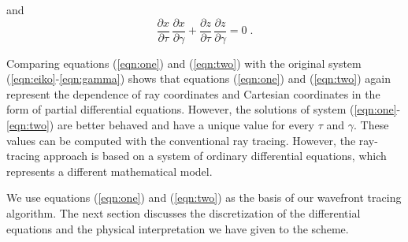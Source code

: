 and
\begin{equation}
  \label{eqn:two}
  \frac{\partial x}{\partial \tau}\,\frac{\partial x}{\partial \gamma}  +
  \frac{\partial z}{\partial \tau}\,\frac{\partial z}{\partial \gamma} = 0\;.
\end{equation}
\par
Comparing equations (\ref{eqn:one}) and (\ref{eqn:two}) with the original
system (\ref{eqn:eiko}-\ref{eqn:gamma}) shows that equations (\ref{eqn:one})
and (\ref{eqn:two}) again represent the dependence of ray coordinates and
Cartesian coordinates in the form of partial differential equations. 
However, the solutions of system (\ref{eqn:one}-\ref{eqn:two}) are better
behaved and have a unique value for every $\tau$ and $\gamma$.  These values
can be computed with the conventional ray tracing. However, the ray-tracing
approach is based on a system of ordinary differential equations, which
represents a different mathematical model.
\par
We use equations (\ref{eqn:one}) and (\ref{eqn:two}) as the basis of our
wavefront tracing algorithm. The next section discusses the discretization of
the differential equations and the physical interpretation we have given to
the scheme.

